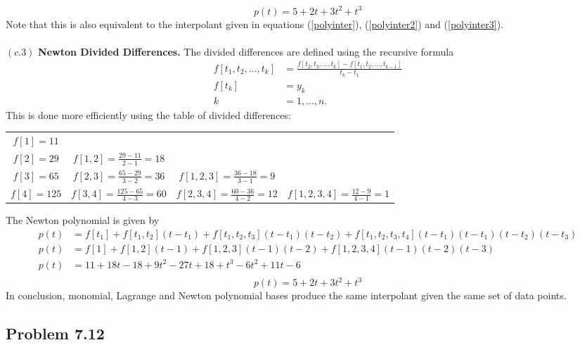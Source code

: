 \begin{equation}\boxed{
	p(t) = 5 + 2t + 3t^2 + t^3
}\end{equation}
Note that this is also equivalent to the interpolant given in equations (\ref{polyinter}), (\ref{polyinter2}) and (\ref{polyinter3}).
\\
\\
$(c.3)$ \textbf{Newton Divided Differences.} The divided differences are defined using the recursive formula 
\begin{align*}
f\left[t_1, t_2, \ldots, t_k\right] &= \frac{f\left[t_2, t_3, \ldots, t_k\right] - f\left[t_1, t_2, \ldots, t_{k-1}\right]}{t_k-t_1} \\
f\left[t_k\right] &= y_k \\
k &= 1,\ldots,n.
\end{align*}
This is done more efficiently using the table of divided differences:
\begin{table}[H]
	\centering
	\begin{tabular}{cccc}
		$f[1]=11$ &  &  &  \\ 
		$f[2]=29$ & $f[1,2]=\frac{29-11}{2-1}=18$ & &  \\ 
		$f[3]=65$ & $f[2,3]=\frac{65-29}{3-2}=36$ & $f[1,2,3] = \frac{36-18}{3-1}=9$ &  \\ 
		$f[4]=125$ & $f[3,4]=\frac{125-65}{4-3}=60 $ &  $f[2,3,4] = \frac{60-36}{4-2}=12$ &  $f[1,2,3,4] = \frac{12-9}{4-1}=1$ \\
	\end{tabular}
\end{table}

The Newton polynomial is given by
\begin{align*}
p(t) &= f[t_1] + f[t_1,t_2](t-t_1) + f[t_1,t_2,t_3](t-t_1)(t-t_2) + f[t_1,t_2,t_3,t_4](t-t_1)(t-t_1)(t-t_2)(t-t_3)\\
p(t) &= f[1] + f[1,2](t-1) + f[1,2,3](t-1)(t-2) + f[1,2,3,4](t-1)(t-2)(t-3)\\
p(t) &= 11 + 18t - 18 + 9t^2 -27t + 18 + t^3 - 6t^2 + 11t - 6\\
\end{align*}
\begin{equation}\label{polyinter4}
\boxed{
	p(t) = 5 + 2t + 3t^2 + t^3
}
\end{equation}
In conclusion, monomial, Lagrange and Newton polynomial bases produce the same interpolant given the same set of data points.

\subsection{Problem 7.12}
